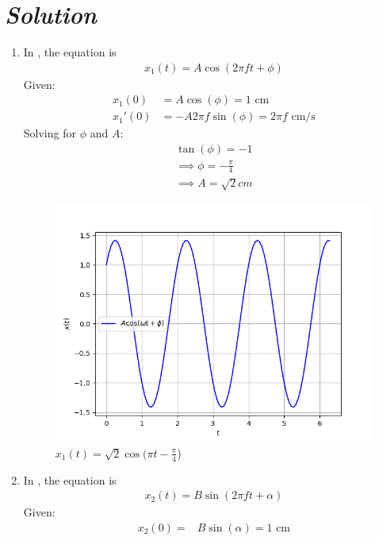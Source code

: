 \documentclass[journal,12pt,twocolumn]{IEEEtran}
\theoremstyle{remark}
\begin{document}
\section*{\textit{\textbf{Solution}}}
\fi

\begin{enumerate}
\item In , the equation is
\begin{align}
   x_1(t) = A \cos(2\pi f t + \phi)  
\end{align}
Given:
\begin{align}
     x_1(0)&= A \cos(\phi) = 1 \text{ cm} \\
 x_1'(0)&= -A 2\pi f \sin(\phi) = 2\pi f \text{ cm/s} 
 \end{align}
Solving for $\phi$ and $A$:
\begin{align}
    \tan(\phi) = -1\\
\implies
\phi = -\frac{\pi}{4} \\
\implies 
A= \sqrt{2}cm
\end{align}
\begin{figure}[h]
\renewcommand\thefigure{1}
    \centering
    \includegraphics[width=0.8\columnwidth]{ncert-physics/11/14/7/figs/fig1.png}
    \caption{$x_1(t) = \sqrt{2}\cos(\pi t - \frac{\pi}{4}$)}
    \label{Fig1_11.14.7}
\end{figure}
    \item In , the equation is
\begin{align}
    x_2(t) = B \sin(2\pi f t + \alpha) 
    \end{align}
    Given:\\
    \begin{align}
     x_2(0)=& B \sin(\alpha) = 1 \text{ cm} \\

\end{align}
\end{enumerate}
\end{document}
